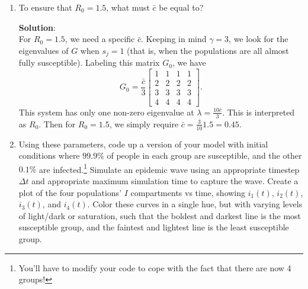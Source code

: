 \documentclass[11pt]{article}
\begin{document}
\begin{enumerate}
\begin{enumerate}[label=\alph*.]
	\item To ensure that $R_0=1.5$, what must $\bar{c}$ be equal to?
	
	\begin{tcolorbox}[breakable]
		\textbf{Solution}:\\
		For $R_0=1.5$, we need a specific $\bar{c}$. Keeping in mind $\gamma=3$, we look for the eigenvalues of $G$ when $s_j=1$ (that is, when the populations are all almost fully susceptible). Labeling this matrix $G_0$, we have
		\begin{equation*}
			G_0=\frac{\bar{c}}{3}\begin{bmatrix}
			1&1&1&1\\
			2&2&2&2\\
			3&3&3&3\\
			4&4&4&4
			\end{bmatrix}.
		\end{equation*}
		This system has only one non-zero eigenvalue at $\lambda = \frac{10 \bar{c}}{3}$. This is interpreted as $R_0$. Then for $R_0=1.5$, we simply require $\bar{c}=\frac{3}{10}1.5 = 0.45$.
	\end{tcolorbox}
	
	\item Using these parameters, code up a version of your model with initial conditions where $99.9\%$ of people in each group are susceptible, and the other $0.1\%$ are infected.\footnote{You'll have to modify your code to cope with the fact that there are now 4 groups!} Simulate an epidemic wave using an appropriate timestep $\Delta t$ and appropriate maximum simulation time to capture the wave. Create a plot of the four populations' $I$ compartments vs time, showing $i_1(t)$, $i_2(t)$, $i_3(t)$, and $i_4(t)$. Color these curves in a single hue, but with varying levels of light/dark or saturation, such that the boldest and darkest line is the most susceptible group, and the faintest and lightest line is the least susceptible group.
	

\end{enumerate}
\end{enumerate}
\end{document}
